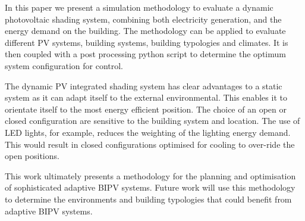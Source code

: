 
In this paper we present a simulation methodology to evaluate a dynamic photovoltaic shading system, combining both electricity generation, and the energy demand on the building. The methodology can be applied to evaluate different PV systems, building systems, building typologies and climates. It is then coupled with a post processing python script to determine the optimum system configuration for control. 

The dynamic PV integrated shading system has clear advantages to a static system as it can adapt itself to the external environmental. This enables it to orientate itself to the most energy efficient position. The choice of an open or closed configuration are sensitive to the building system and location. The use of LED lights, for example, reduces the weighting of the lighting energy demand. This would result in closed configurations optimised for cooling to over-ride the open positions. 

This work ultimately presents a methodology for the planning and optimisation of sophisticated adaptive BIPV systems. Future work will use this methodology to determine the environments and building typologies that could benefit from adaptive BIPV systems. 



